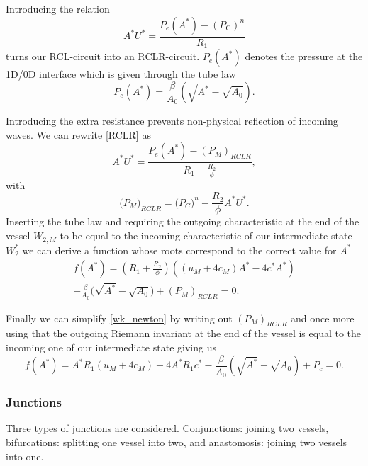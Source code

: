 \documentclass[a4paper, oneside]{discothesis}
\begin{document}
Introducing the relation
\begin{equation}
	A^{*}U^{*}={\frac{P_e(A^{*})-(P_{\mathrm{C}})^{n}}{R_{1}}} \label{RCLR}
\end{equation}
turns our RCL-circuit into an RCLR-circuit.
$P_e(A^*)$ denotes the pressure at the 1D/0D interface which is given through the tube law
\begin{equation}
	P_{e}(A^*)={\frac{\beta}{A_{0}}}\left({\sqrt{A^{*}}}-{\sqrt{A_{0}}}\right).
\end{equation}

Introducing the extra resistance prevents non-physical reflection of incoming waves.
We can rewrite \ref{RCLR} as 
\begin{equation}
	A^{*}U^{*}={\frac{P_e(A^{*})-(P_{M})_{R C L R}}{R_{1}+{\frac{R_{2}}{\phi}}}}, 
\end{equation}
with 
\begin{equation}
	\bigl(P_{M}\bigr)_{RCLR}=\bigl(P_{C}\bigr)^{n}-{\frac{R_{2}}{\phi}}A^{\ast}U^{\ast}.
\end{equation}
Inserting the tube law and requiring the outgoing characteristic at the end of the vessel $W_{2,M}$ to be equal to the incoming characteristic of our intermediate state $W_2^*$ we can derive a function whose roots correspond to the correct value for $A^*$
\begin{multline}
	f(A^{*}) = \left(R_{1}+{\frac{R_{2}}{\phi}}\right)\left( \left(u_{M}+4c_{M} \right)A^{*}-4c^*A^{*} \right) \\
	-{\frac{\beta}{A_{0}}}\Big(\sqrt{A^{*}}-\sqrt{A_{0}}\Big)+(P_{M})_{R C L R} =0. \label{wk_newton}
\end{multline}

Finally we can simplify \ref{wk_newton} by writing out $(P_{M})_{RCLR}$ and once more using that the outgoing Riemann invariant at the end of the vessel is equal to the incoming one of our intermediate state giving us
\begin{equation}
	f\left(A^*\right)=A^* R_1\left(u_M+4 c_M\right)-4 A^* R_1 c^*-\frac{\beta}{A_0}\left(\sqrt{A^*}-\sqrt{A_0}\right)+P_c = 0. \label{wk_eq3}
\end{equation}


\subsubsection{Junctions} \label{sssec:junctions}
Three types of junctions are considered.
Conjunctions: joining two vessels, bifurcations: splitting one vessel into two, and anastomosis: joining two vessels into one.
\end{document}
